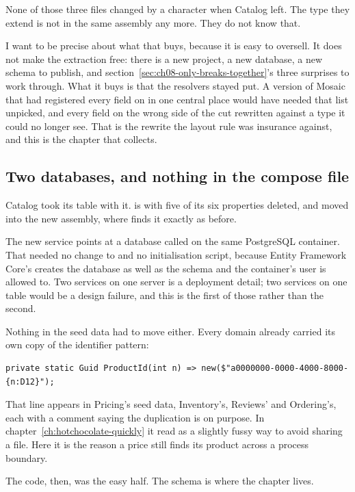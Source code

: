 None of those three files changed by a character when Catalog left. The type
they extend is not in the same assembly any more. They do not know that.

%
I want to be precise about what that buys, because it is easy to oversell. It
does not make the extraction free: there is a new project, a new database, a new
schema to publish, and section~\ref{sec:ch08-only-breaks-together}'s three
surprises to work through. What it buys is that the resolvers stayed put. A
version of Mosaic that had registered every field on  in one
central place would have needed that list unpicked, and every field on the wrong
side of the cut rewritten against a type it could no longer see. That is the
rewrite the layout rule was insurance against, and this is the chapter that
collects.

\subsection*{Two databases, and nothing in the compose file}

%
Catalog took its table with it.  is
 with five of its six  properties deleted, and
 moved into the new assembly, where
 finds it exactly as before.

The new service points at a database called  on the same
PostgreSQL container. That needed no change to  and no
initialisation script, because Entity Framework Core's
 creates the database as well as the schema and the
container's user is allowed to. Two services on one server is a deployment
detail; two services on one table would be a design failure, and this is the
first of those rather than the second.

Nothing in the seed data had to move either. Every domain already carried its
own copy of the identifier pattern:

\begin{verbatim}
private static Guid ProductId(int n) => new($"a0000000-0000-4000-8000-{n:D12}");
\end{verbatim}

That line appears in Pricing's seed data, Inventory's, Reviews' and Ordering's,
each with a comment saying the duplication is on purpose. In
chapter~\ref{ch:hotchocolate-quickly} it read as a slightly fussy way to avoid
sharing a file. Here it is the reason a price still finds its product across a
process boundary.

The code, then, was the easy half. The schema is where the chapter lives.

%
